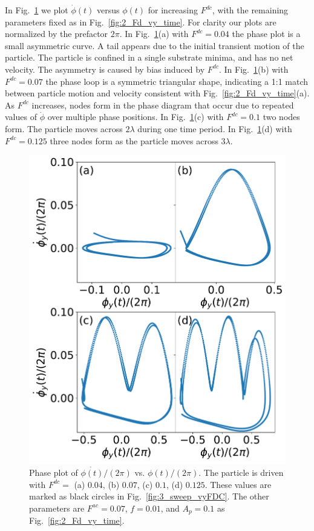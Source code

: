 \documentclass[twocolumn,preprintnumbers,amsmath,amssymb,aps,prb]{revtex4}
\begin{document}
  In Fig.~\ref{fig:4_phase}
  we plot $\dot{\phi}(t)$ versus $\phi(t)$
  for increasing 
  $F^{dc}$, 
  with the remaining parameters fixed as in Fig.~\ref{fig:2_Fd_vy_time}.
  For clarity our plots are normalized by the prefactor $2\pi$. 
  In Fig.~\ref{fig:4_phase}(a) with
  $F^{dc} = 0.04$
  the phase plot is a small asymmetric curve.
  A tail appears
  due to the initial transient
  motion of the particle.
  The particle is confined in a single
  substrate minima,
  and has no net velocity.
  The asymmetry is caused by bias induced by $F^{dc}$.
  In Fig.~\ref{fig:4_phase}(b)
  with $F^{dc} = 0.07$
  the phase loop is a symmetric triangular shape,
  indicating a 1:1 match between
  particle motion and velocity consistent with 
  Fig.~\ref{fig:2_Fd_vy_time}(a).
  As $F^{dc}$ 
  increases,
  nodes form in the phase diagram
  that occur due to repeated values
  of $\dot{\phi}$ over multiple phase positions.
  In Fig.~\ref{fig:4_phase}(c)
  with $F^{dc} = 0.1$
  two nodes form.
  The particle moves across $2\lambda$
  during one time period.
  In Fig.~\ref{fig:4_phase}(d)
  with $F^{dc} = 0.125$
  three nodes form as the particle moves across $3\lambda$.
    \begin{figure} %
      \centering
      \includegraphics[width=\columnwidth]{fig4_phase.pdf}
      \caption{
        Phase plot of $\dot{\phi(t)}/(2\pi)$ vs. $\phi(t)/(2\pi)$.
        The particle is driven with $F^{dc} = $ (a) $0.04$, (b) $0.07$, (c) $0.1$, (d) $0.125$.  These values are marked as black circles
        in Fig.~\ref{fig:3_sweep_vyFDC}. 
      The other parameters
      are $F^{ac} = 0.07$, $f=0.01$, and $A_p = 0.1$
      as Fig.~\ref{fig:2_Fd_vy_time}.}
      \label{fig:4_phase}
    \end{figure}
\end{document}
